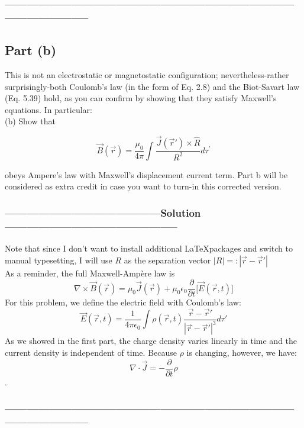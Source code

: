 \documentclass[a4paper,12pt]{article} %
\begin{document}
\subsubsection*{-----------------------------------------------------------------------------------------------------}
\subsection*{Part (b)}
This is not an electrostatic or magnetostatic configuration; nevertheless-rather surprisingly-both Coulomb's law (in the form of Eq. 2.8) and the Biot-Savart law (Eq. 5.39) hold, as you can confirm by showing that they satisfy Maxwell's equations. In particular:\\

(b) Show that

$$
\vec{B}(\vec{r})=\frac{\mu_0}{4 \pi} \int \frac{\vec{J}\left(\overrightarrow{r}'\right) \times \hat{R}}{R^2} d \tau^{\prime}
$$

obeys Ampere's law with Maxwell's displacement current term.
Part b will be considered as extra credit in case you want to turn-in this corrected version.

\subsubsection*{------------------------------------------Solution-----------------------------------------------}
Note that since I don't want to install additional \LaTeX  packages and switch to manual typesetting, I will use $R$ as the separation vector $|R| =: |\vec{r} - \overrightarrow{r}'| $\\

As a reminder, the full Maxwell-Ampère law is
\begin{equation}
\nabla \times \vec{B}(\vec{r}) = \mu_0\vec{J}(\vec{r}) + \mu_0\epsilon_0\frac{\partial}{\partial t} \Big[\vec{E}(\vec{r}, t)\Big]
	\label{eq:maxwell-ampere-law}
\end{equation}
For this problem, we define the electric field with Coulomb's law:
\begin{equation}
\vec{E}(\vec{r}, t) = \frac{1}{4\pi\epsilon_0} \int \rho(\vec{r}, t)\frac{\vec{r} - \overrightarrow{r}'}{|\vec{r} - \overrightarrow{r}'|^3}d\tau'
	\label{eq:coulomb-law}
\end{equation}
As we showed in the first part, the charge density varies linearly in time and the current density is independent of time. Because $\rho$ is changing, however, we have:
$$ \nabla \cdot \vec{J} = -\frac{\partial}{\partial t} \rho $$.

\subsubsection*{-----------------------------------------------------------------------------------------------------}
\end{document}
